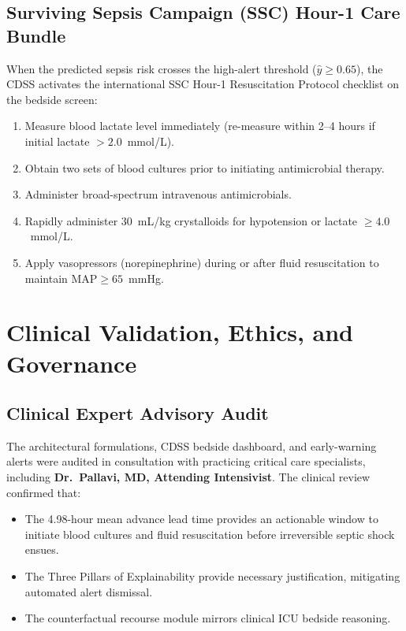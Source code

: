 \documentclass[10pt,a4paper,twocolumn,twoside]{article}
\begin{document}
\subsection{Surviving Sepsis Campaign (SSC) Hour-1 Care Bundle}
When the predicted sepsis risk crosses the high-alert threshold ($\hat{y} \ge 0.65$), the CDSS activates the international SSC Hour-1 Resuscitation Protocol checklist on the bedside screen:
\begin{enumerate}
    \item Measure blood lactate level immediately (re-measure within 2--4 hours if initial lactate $>2.0$~mmol/L).
    \item Obtain two sets of blood cultures prior to initiating antimicrobial therapy.
    \item Administer broad-spectrum intravenous antimicrobials.
    \item Rapidly administer $30$~mL/kg crystalloids for hypotension or lactate $\ge 4.0$~mmol/L.
    \item Apply vasopressors (norepinephrine) during or after fluid resuscitation to maintain $\text{MAP} \ge 65$~mmHg.
\end{enumerate}

\section{Clinical Validation, Ethics, and Governance}
\subsection{Clinical Expert Advisory Audit}
The architectural formulations, CDSS bedside dashboard, and early-warning alerts were audited in consultation with practicing critical care specialists, including \textbf{Dr.~Pallavi, MD, Attending Intensivist}. The clinical review confirmed that:
\begin{itemize}
    \item The 4.98-hour mean advance lead time provides an actionable window to initiate blood cultures and fluid resuscitation before irreversible septic shock ensues.
    \item The Three Pillars of Explainability provide necessary justification, mitigating automated alert dismissal.
    \item The counterfactual recourse module mirrors clinical ICU bedside reasoning.
\end{itemize}
\end{document}
